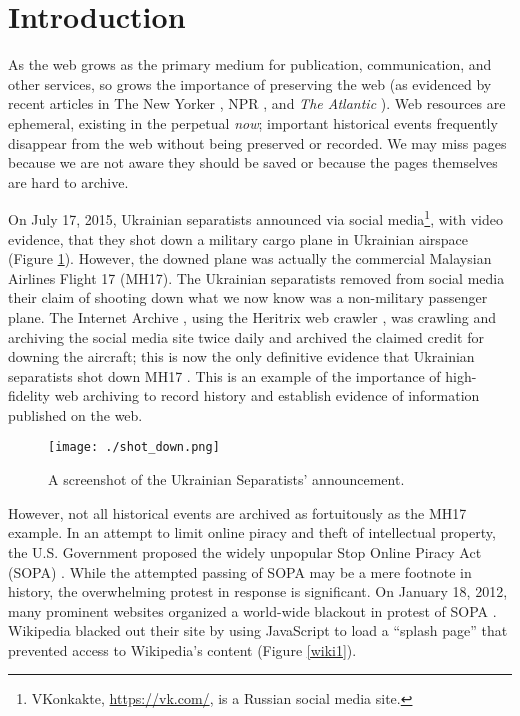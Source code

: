 \documentclass{sig-alternate}
\begin{document}



\section{Introduction}
\label{intro}

As the web grows as the primary medium for publication, communication, and other services, so grows the importance of preserving the web (as evidenced by recent articles in The New Yorker \cite{newyorker}, NPR \cite{npr}, and \emph{The Atlantic} \cite{lafrance}). Web resources are ephemeral, existing in the perpetual \emph{now}; important historical events frequently disappear from the web without being preserved or recorded. We may miss pages because we are not aware they should be saved or because the pages themselves are hard to archive. 

On July 17, 2015, Ukrainian separatists announced via social media\footnote{VKonkakte, \url{https://vk.com/}, is a Russian social media site.}, with video evidence, that they shot down a military cargo plane in Ukrainian airspace (Figure \ref{shotdown}). However, the downed plane was actually the commercial Malaysian Airlines Flight 17 (MH17). The Ukrainian separatists removed from social media their claim of shooting down what we now know was a non-military passenger plane. The Internet Archive \cite{iawebarchive}, using the Heritrix web crawler \cite{heritrix, Sigurosson:Incremental-Heritrix}, was crawling and archiving the social media site twice daily and archived the claimed credit for downing the aircraft; this is now the only definitive evidence that Ukrainian separatists shot down MH17 \cite{csm}. This is an example of the importance of high-fidelity web archiving to record history and establish evidence of information published on the web.

\begin{figure}[h!]
    \texttt{[image: ./shot\_down.png]}
  \caption{A screenshot of the Ukrainian Separatists' announcement.}
\label{shotdown}
\end{figure}%

However, not all historical events are archived as fortuitously as the MH17 example. In an attempt to limit online piracy and theft of intellectual property, the U.S. Government proposed the widely unpopular Stop Online Piracy Act (SOPA) \cite{sopawiki}. While the attempted passing of SOPA may be a mere footnote in history, the overwhelming protest in response is significant. On January 18, 2012, many prominent websites organized a world-wide blackout in protest of SOPA \cite{sopapost, sopaabc}. Wikipedia blacked out their site by using JavaScript to load a ``splash page'' that prevented access to Wikipedia's content (Figure \ref{wiki1}).
\end{document}
